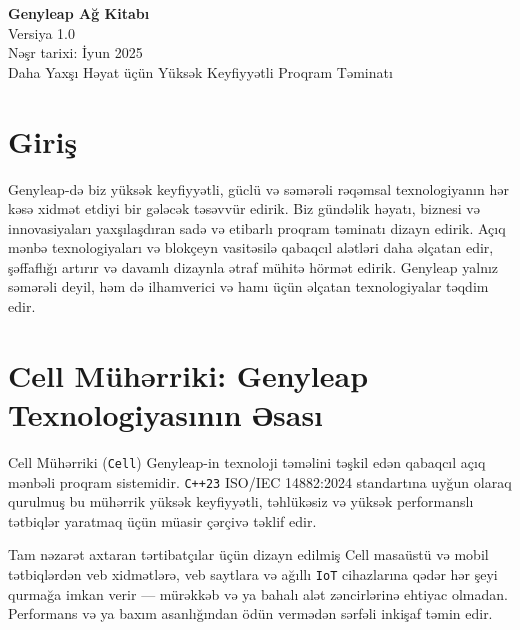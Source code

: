\documentclass[a4paper,12pt,openany]{book}
\begin{document}
\begin{titlepage}
    \begin{center}
        \vspace*{1.5cm}
        {\Huge \textbf{Genyleap Ağ Kitabı}} \\
        \vspace{0.5cm}
        {\Large Versiya 1.0} \\
        \vspace{0.5cm}
        {\large Nəşr tarixi: İyun 2025} \\
        \vspace{1.5cm}
        {\large Daha Yaxşı Həyat üçün Yüksək Keyfiyyətli Proqram Təminatı} \\
    \end{center}
    \vfill
\end{titlepage}

\chapter{Giriş}
Genyleap-də biz yüksək keyfiyyətli, güclü və səmərəli rəqəmsal texnologiyanın hər kəsə xidmət etdiyi bir gələcək təsəvvür edirik. Biz gündəlik həyatı, biznesi və innovasiyaları yaxşılaşdıran sadə və etibarlı proqram təminatı dizayn edirik. Açıq mənbə texnologiyaları və blokçeyn vasitəsilə qabaqcıl alətləri daha əlçatan edir, şəffaflığı artırır və davamlı dizaynla ətraf mühitə hörmət edirik. Genyleap yalnız səmərəli deyil, həm də ilhamverici və hamı üçün əlçatan texnologiyalar təqdim edir.

\chapter{Cell Mühərriki: Genyleap Texnologiyasının Əsası}

Cell Mühərriki (\texttt{Cell}) Genyleap-in texnoloji təməlini təşkil edən qabaqcıl açıq mənbəli proqram sistemidir. \texttt{C++23} ISO/IEC 14882:2024 standartına uyğun olaraq qurulmuş bu mühərrik yüksək keyfiyyətli, təhlükəsiz və yüksək performanslı tətbiqlər yaratmaq üçün müasir çərçivə təklif edir.

Tam nəzarət axtaran tərtibatçılar üçün dizayn edilmiş Cell masaüstü və mobil tətbiqlərdən veb xidmətlərə, veb saytlara və ağıllı \texttt{IoT} cihazlarına qədər hər şeyi qurmağa imkan verir — mürəkkəb və ya bahalı alət zəncirlərinə ehtiyac olmadan. Performans və ya baxım asanlığından ödün vermədən sərfəli inkişaf təmin edir.
\end{document}
